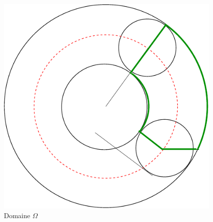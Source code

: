 
\begin{figure}[ht]
 \centering
  \includegraphics{Cplanimetre_1.pdf}
 \caption{Domaine $\Omega$}
 \label{fig:Cplanimetre_1}
\end{figure}

